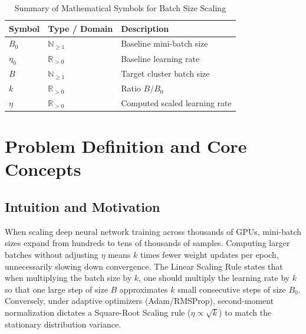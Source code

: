 \documentclass[11pt,a4paper]{article}
\theoremstyle{definition}
\begin{document}
\begin{table}[h]
\centering
\caption{Summary of Mathematical Symbols for Batch Size Scaling}
\begin{tabular}{lll}
\toprule
\textbf{Symbol} & \textbf{Type / Domain} & \textbf{Description} \\
\midrule
$B_0$ & $\mathbb{N}_{\ge 1}$ & Baseline mini-batch size \\
$\eta_0$ & $\mathbb{R}_{> 0}$ & Baseline learning rate \\
$B$ & $\mathbb{N}_{\ge 1}$ & Target cluster batch size \\
$k$ & $\mathbb{R}_{> 0}$ & Ratio $B / B_0$ \\
$\eta$ & $\mathbb{R}_{> 0}$ & Computed scaled learning rate \\
\bottomrule
\end{tabular}
\end{table}

\section{Problem Definition and Core Concepts}

\subsection{Intuition and Motivation}
When scaling deep neural network training across thousands of GPUs, mini-batch sizes expand from hundreds to tens of thousands of samples. Computing larger batches without adjusting $\eta$ means $k$ times fewer weight updates per epoch, unnecessarily slowing down convergence. The Linear Scaling Rule states that when multiplying the batch size by $k$, one should multiply the learning rate by $k$ so that one large step of size $B$ approximates $k$ small consecutive steps of size $B_0$. Conversely, under adaptive optimizers (Adam/RMSProp), second-moment normalization dictates a Square-Root Scaling rule ($\eta \propto \sqrt{k}$) to match the stationary distribution variance.
\end{document}
